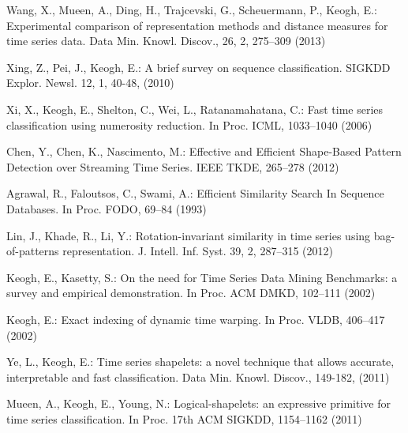 \documentclass[conference]{IEEEtran}
\begin{document}

%
%
\begin{thebibliography}{5}
Wang, X., Mueen, A., Ding, H., Trajcevski, G., Scheuermann, P., Keogh, E.:
Experimental comparison of representation methods and distance measures for time series data.
Data Min. Knowl. Discov., 26, 2, 275--309 (2013)

Xing, Z., Pei, J., Keogh, E.:
A brief survey on sequence classification. 
SIGKDD Explor. Newsl. 12, 1, 40-48, (2010)


Xi, X., Keogh, E., Shelton, C., Wei, L., Ratanamahatana, C.:
Fast time series classification using numerosity reduction. 
In Proc. ICML, 1033--1040 (2006)

Chen, Y., Chen, K., Nascimento, M.:
Effective and Efficient Shape-Based Pattern Detection over Streaming Time Series. 
IEEE TKDE, 265--278 (2012)

Agrawal, R., Faloutsos, C., Swami, A.:
Efficient Similarity Search In Sequence Databases.
In Proc. FODO, 69--84 (1993)

Lin, J., Khade, R., Li, Y.:
Rotation-invariant similarity in time series using bag-of-patterns representation. 
J. Intell. Inf. Syst. 39, 2, 287--315 (2012)

Keogh, E., Kasetty, S.:
On the need for Time Series Data Mining Benchmarks: a survey and empirical demonstration.
In Proc. ACM DMKD, 102--111 (2002)

Keogh, E.:
Exact indexing of dynamic time warping. 
In Proc. VLDB, 406--417 (2002)

Ye, L., Keogh, E.:
Time series shapelets: a novel technique that allows accurate, interpretable and fast
classification.
Data Min. Knowl. Discov.,  149-182, (2011)

Mueen, A., Keogh, E., Young, N.:
Logical-shapelets: an expressive primitive for time series classification.
In Proc. 17th ACM SIGKDD, 1154--1162 (2011)


\end{thebibliography}
\end{document}
